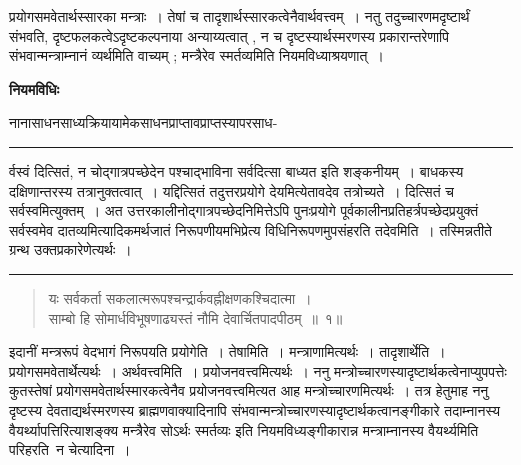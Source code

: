 \documentclass[11pt, openany]{book}
\begin{document}
{\bl प्रयोगसमवेतार्थस्सारका मन्त्राः~। तेषां च तादृशार्थस्सारकत्वेनैवार्थवत्त्वम्~। नतु तदुच्चारणमदृष्टार्थं संभवति, दृष्टफलकत्वेऽदृष्टकल्पनाया अन्याय्यत्वात् , न च दृष्टस्यार्थस्मरणस्य प्रकारान्तरेणापि संभवान्मन्त्राम्नानं व्यर्थमिति वाच्यम् ; मन्त्रैरेव स्मर्तव्यमिति नियमविध्याश्रयणात्~।}
\begin{center}\textbf{नियमविधिः}\end{center}
{\bl नानासाधनसाध्यक्रियायामेकसाधनप्राप्तावप्राप्तस्यापरसाध-\\} 
\hrule
\vspace{3mm}
\noindent
र्वस्वं दित्सितं, न चोद्गात्रपच्छेदेन पश्चाद्भाविना सर्वदित्सा बाध्यत इति शङ्कनीयम्~। बाधकस्य दक्षिणान्तरस्य तत्रानुक्तत्वात्~। यद्दित्सितं तदुत्तरप्रयोगे देयमित्येतावदेव तत्रोच्यते~। दित्सितं च सर्वस्वमित्युक्तम्~। अत उत्तरकालीनोद्गात्रपच्छेदनिमित्तेऽपि पुनःप्रयोगे पूर्वकालीनप्रतिहर्त्रपच्छेदप्रयुक्तं सर्वस्वमेव दातव्यमित्यादिकमर्थजातं
निरूपणीयमभिप्रेत्य विधिनिरूपणमुपसंहरति {\br तदेवमिति~।} तस्मिन्नतीते ग्रन्थ उक्तप्रकारेणेत्यर्थः~।
\begin{center}
    \rule{.15\linewidth}{1pt}
\end{center}
\begin{quote}
    \ab यः सर्वकर्ता सकलात्मरूपश्चन्द्रार्कवह्नीक्षणकश्चिदात्मा~।\\
साम्बो हि सोमार्धविभूषणाढ्यस्तं नौमि देवार्चितपादपीठम्~॥~१॥
\end{quote}

 इदानीं मन्त्ररूपं वेदभागं निरूपयति {\br प्रयोगेति~। तेषामिति~।} मन्त्राणामित्यर्थः~। {\br तादृशार्थेति~।} प्रयोगसमवेतार्थेत्यर्थः~। {\br अर्थवत्त्वमिति~।} प्रयोजनवत्त्वमित्यर्थः~। {\br ननु} मन्त्रोच्चारणस्यादृष्टार्थकत्वेनाप्युपपत्तेः कुतस्तेषां प्रयोगसमवेतार्थस्मारकत्वेनैव प्रयोजनवत्त्वमित्यत आह मन्त्रोच्चारणमित्यर्थः~। तत्र हेतुमाह {\br ननु} दृष्टस्य देवताद्यर्थस्मरणस्य ब्राह्मणवाक्यादिनापि
संभवान्मन्त्रोच्चारणस्यादृष्टार्थकत्वानङ्गीकारे तदाम्नानस्य वैयर्थ्यापत्तिरित्याशङ्क्य {\qt मन्त्रैरेव सोऽर्थः स्मर्तव्यः} इति नियमविध्यङ्गीकारान्न मन्त्राम्नानस्य वैयर्थ्यमिति परिहरति\textemdash\ {\br न चेत्यादिना~।} \\
\end{document}
